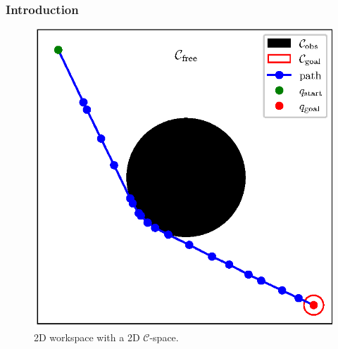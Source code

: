 \documentclass{beamer}
\begin{document}
\begin{frame}
	\frametitle{Introduction}	
	\begin{figure}
		\centering
		\includegraphics[width=0.5\linewidth]{figChap2/ConfigSpace.eps}
		\caption{2D workspace with a 2D $\mathcal{C}$-space.}
		\label{fig:config_space} 
	  \end{figure} 
\end{frame}
\end{document}
